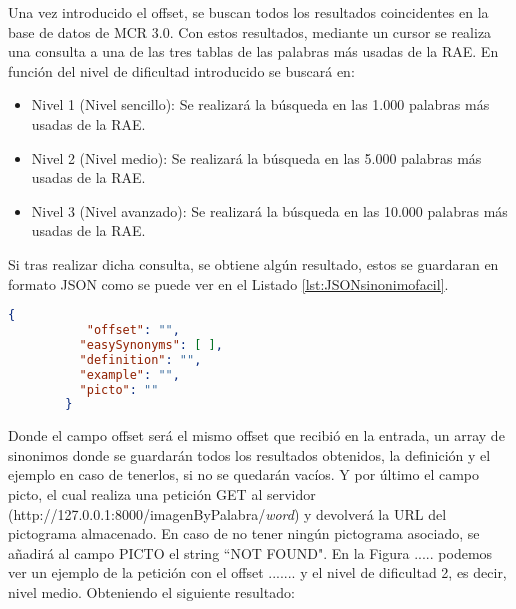 Una vez introducido el offset, se buscan todos los resultados coincidentes en la base de datos de MCR 3.0. Con estos resultados, mediante un cursor se realiza una consulta a una de las tres tablas de las palabras más usadas de la RAE. En función del nivel de dificultad introducido se buscará en:
\begin{itemize}
	\item Nivel 1 (Nivel sencillo): Se realizará la búsqueda en las 1.000 palabras más usadas de la RAE.
	\item Nivel 2 (Nivel medio): Se realizará la búsqueda en las 5.000 palabras más usadas de la RAE.
	\item Nivel 3 (Nivel avanzado): Se realizará la búsqueda en las 10.000 palabras más usadas de la RAE.
\end{itemize}

Si tras realizar dicha consulta, se obtiene algún resultado, estos se guardaran en formato JSON como se puede ver en el Listado  \ref{lst:JSONsinonimofacil}.





	
	\begin{lstlisting}[language=json, caption= Estructura JSON para sinónimos fáciles, label={lst:JSONsinonimofacil}, frame=single]
		{ 
		   "offset": "", 
	      "easySynonyms": [ ], 
	      "definition": "", 
	      "example": "", 
	      "picto": ""
	    }
	\end{lstlisting}
	
Donde el campo offset será el mismo offset que recibió en la entrada,  un array de sinonimos donde se guardarán todos los resultados obtenidos, la definición y el ejemplo en caso de tenerlos, si no se quedarán vacíos. Y por último el campo picto, el cual realiza una petición GET al servidor (http://127.0.0.1:8000/imagenByPalabra/\textit{word}) y devolverá la URL del pictograma almacenado. En caso de no tener ningún pictograma asociado, se añadirá al campo PICTO el string ``NOT FOUND".
En la Figura ..... podemos ver un ejemplo de la petición con el offset ....... y el nivel de dificultad 2, es decir, nivel medio. Obteniendo el siguiente resultado:



